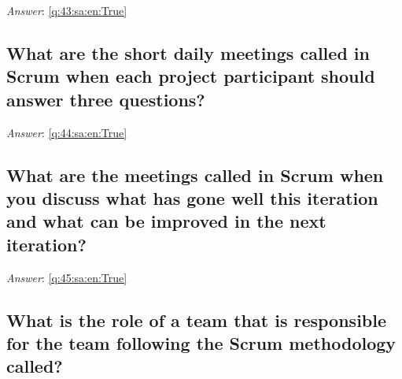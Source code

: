 \documentclass[a4paper,11pt,oneside]{article}
\begin{document}
\begin{sloppypar}
\label{q:43:sa:en:False}

\vspace{2cm}

\noindent\makebox[\textwidth]{\hrulefill}

\vspace{1cm}

\textit{Answer}: \autoref{q:43:sa:en:True}



\subsection{What are the short daily meetings called in Scrum when each project participant should answer three questions?}

\label{q:44:sa:en:False}

\vspace{2cm}

\noindent\makebox[\textwidth]{\hrulefill}

\vspace{1cm}

\textit{Answer}: \autoref{q:44:sa:en:True}



\subsection{What are the meetings called in Scrum when you discuss what has gone well this iteration and what can be improved in the next iteration?}

\label{q:45:sa:en:False}

\vspace{2cm}

\noindent\makebox[\textwidth]{\hrulefill}

\vspace{1cm}

\textit{Answer}: \autoref{q:45:sa:en:True}



\subsection{What is the role of a team that is responsible for the team following the Scrum methodology called?}

\label{q:46:sa:en:False}

\vspace{2cm}

\noindent\makebox[\textwidth]{\hrulefill}


\end{sloppypar}
\end{document}
